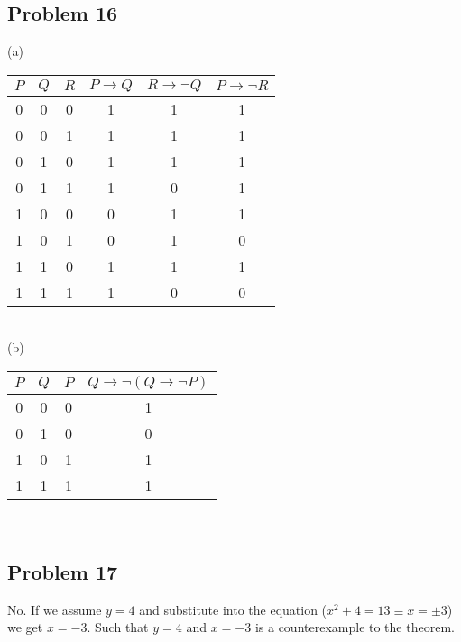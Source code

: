 \documentclass{article}
\begin{document}
\subsection{Problem 16}
(a)\\
\begin{tabular}{c|c|c|c|c|c}
$P$ & $Q$ & $R$ & $P \rightarrow Q$ & $R \rightarrow \lnot Q$ & $P \rightarrow \lnot R$\\\hline
0 & 0 & 0 & 1 & 1 & 1\\
0 & 0 & 1 & 1 & 1 & 1\\
0 & 1 & 0 & 1 & 1 & 1\\
0 & 1 & 1 & 1 & 0 & 1\\
1 & 0 & 0 & 0 & 1 & 1\\
1 & 0 & 1 & 0 & 1 & 0\\
1 & 1 & 0 & 1 & 1 & 1\\
1 & 1 & 1 & 1 & 0 & 0
\end{tabular}\\
(b)
\begin{table}[h!]
\begin{tabular}{c|c|c|c}
$P$ & $Q$ & $P$ & $Q \rightarrow \lnot (Q \rightarrow \lnot P)$ \\\hline
0 & 0 & 0 & 1\\
0 & 1 & 0 & 0\\
1 & 0 & 1 & 1\\
1 & 1 & 1 & 1 
\end{tabular}
\end{table}\

\subsection{Problem 17}
No. If we assume $y=4$ and substitute into the equation ($x^2+4=13 \equiv x = \pm 3$) we get $x=-3$. Such that $y=4$ and $x=-3$ is a counterexample to the theorem.
\end{document}

